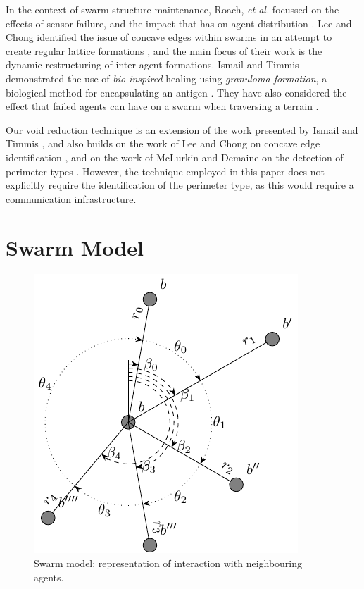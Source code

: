 \documentclass[letterpaper]{article}
\begin{document}
In the context of swarm structure maintenance, Roach, {\it et al.} focussed on the effects of sensor failure, and the impact that has on agent distribution \citep{RMT:15}. Lee and Chong identified the issue of concave edges within swarms in an attempt to create regular lattice formations \citep{GN:08}, and the main focus of their work is the dynamic restructuring of inter-agent formations. Ismail and Timmis demonstrated the use of  \textit{bio-inspired} healing using \textit{granuloma formation}, a biological method for encapsulating an antigen \citep{IT:10}. They have also considered the effect that failed agents can have on a swarm when traversing a terrain \citep{TIBW:16}. 

Our void reduction technique is an extension of the work presented by Ismail and Timmis \citep{IT:10,TIBW:16}, and also builds on the work of Lee and Chong on concave edge identification \citep{GN:08}, and on the work of McLurkin and Demaine on the detection of perimeter types \citep{MD:09}. However, the technique employed in this paper does not explicitly require the identification of the perimeter type, as this would require a communication infrastructure.

\section{Swarm Model}
\label{sec:SwarmModel}

\begin{figure}
\begin{center}
\includegraphics{figures/neighbours}
\end{center}
\caption{Swarm model: representation of interaction with neighbouring agents.  \label{define:neighbours}}
\end{figure}
\end{document}
